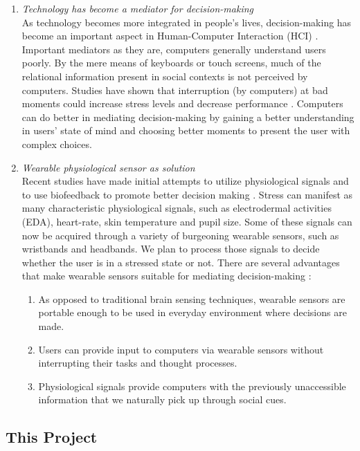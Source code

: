\documentclass[12pt]{article}
\begin{document}
\begin{enumerate}
\item{\it Technology has become a mediator for decision-making}\\
As technology becomes more integrated in people's lives, decision-making has become an important aspect in Human-Computer Interaction (HCI) \cite{Zhou2015}.
Important mediators as they are, computers generally understand users poorly. By the mere means of keyboards or touch screens, much of the relational information present in social contexts is not perceived by computers. Studies have shown that interruption (by computers) at bad moments could increase stress levels and decrease performance \cite{Carton2009}. 
Computers can do better in mediating decision-making by gaining a better understanding in users' state of mind and choosing better moments to present the user with complex choices.\\


\item{\it Wearable physiological sensor as solution}\\
Recent studies have made initial attempts to utilize physiological signals and to use biofeedback to promote better decision making \cite{Carroll2013, Zhou2015}. 
  Stress can manifest as many characteristic physiological signals, such as electrodermal activities (EDA), heart-rate, skin temperature and pupil size. 
  Some of these signals can now be acquired through a variety of burgeoning wearable sensors, such as wristbands and headbands. We plan to process those  signals to decide whether the user is in a stressed state or not. There are several advantages that make wearable sensors suitable for mediating decision-making \cite{Peck2014}:
  \begin{enumerate} 
  \itemsep0pt\parskip0pt
    \item As opposed to traditional brain sensing techniques, wearable sensors are portable enough to be used in everyday  environment where decisions are made.
    \item Users can provide input to computers via wearable sensors without interrupting their tasks and thought processes.
    \item Physiological signals provide computers with the previously unaccessible  information that we naturally pick up through social cues.
  \end{enumerate}
\end{enumerate}

\subsection{This Project}\label{this-project}
\end{document}
